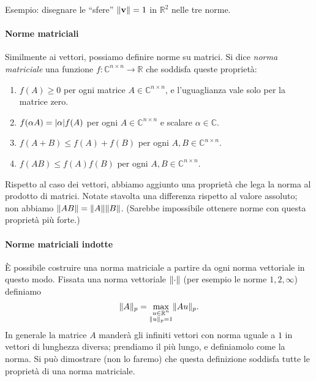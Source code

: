 \documentclass[a4paper]{report}
\DeclarePairedDelimiter{\abs}{\lvert}{\rvert}
\DeclarePairedDelimiter{\norm}{\lVert}{\rVert}
\theoremstyle{definiton}
\theoremstyle{remark}
\begin{document}
Esempio: disegnare le ``sfere'' $\norm{\mathbf{v}}=1$ in $\mathbb{R}^2$ nelle tre norme.

\paragraph{Norme matriciali}

Similmente ai vettori, possiamo definire norme su matrici. Si dice \emph{norma matriciale} una funzione $f: \mathbb{C}^{n\times n} \to \mathbb{R}$ che soddisfa queste proprietà:
\begin{enumerate}
    \item $f(A) \geq 0$ per ogni matrice $A\in\mathbb{C}^{n\times n}$, e l'uguaglianza vale solo per la matrice zero.
    \item $f(\alpha A) = \abs{\alpha} f(A)$ per ogni $A\in\mathbb{C}^{n\times n}$ e scalare $\alpha \in \mathbb{C}$.
    \item $f(A+B) \leq f(A) + f(B)$ per ogni $A,B\in\mathbb{C}^{n\times n}$.
    \item $f(AB) \leq f(A)f(B)$ per ogni $A,B\in\mathbb{C}^{n\times n}$.
\end{enumerate}
Rispetto al caso dei vettori, abbiamo aggiunto una proprietà che lega la norma al prodotto di matrici. Notate stavolta una differenza rispetto al valore assoluto; non abbiamo $\norm{AB} = \norm{A}\norm{B}$. (Sarebbe impossibile ottenere norme con questa proprietà più forte.)

\paragraph{Norme matriciali indotte}

È possibile costruire una norma matriciale a partire da ogni norma vettoriale in questo modo. Fissata una norma vettoriale $\norm{\cdot}$ (per esempio le norme $1,2,\infty$) definiamo
\begin{equation} \label{normamatriciale}
    \norm{A}_p = \max_{\substack{u\in\mathbb{R}^n \\ \norm{u}_p=1}} \norm{Au}_p.
\end{equation}
In generale la matrice $A$ manderà gli infiniti vettori con norma uguale a $1$ in vettori di lunghezza diversa; prendiamo il più lungo, e definiamolo come la norma. Si può dimostrare (non lo faremo) che questa definizione soddisfa tutte le proprietà di una norma matriciale.
\end{document}
